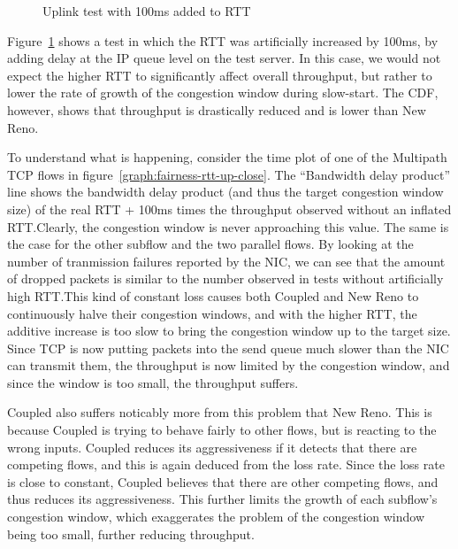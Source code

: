 \begin{figure}[h]
 \centering
 \subfloat[][CDF] {\
   \scalebox{0.55}{}\label{graph:fairness-rtt-up-cdf}
 }
 \subfloat[][Multipath TCP time plot] {\
   \scalebox{0.55}{}\label{graph:fairness-rtt-up-close}
 }
 \caption{Uplink test with 100ms added to RTT}\label{graph:fairness-rtt-up}
\end{figure}

Figure~\ref{graph:fairness-rtt-up} shows a test in which the RTT was
artificially increased by 100ms, by adding delay at the IP queue level on the test
server. In this case, we would not expect the higher RTT to significantly affect overall throughput, but rather to lower the rate of growth of the congestion window during slow-start. The CDF, however, shows that throughput is drastically reduced and is lower than New Reno.

To understand what is happening, consider the time plot of one of the Multipath
TCP flows in figure~\ref{graph:fairness-rtt-up-close}. The ``Bandwidth delay
product'' line shows the bandwidth delay product (and thus the target congestion
window size) of the real RTT + 100ms times the throughput observed without an
inflated RTT.\@ Clearly, the congestion window is never approaching this
value. The same is the case for the other subflow and the two parallel flows. By
looking at the number of tranmission failures reported by the NIC, we can see
that the amount of dropped packets is similar to the number observed in tests without artificially high RTT.\@ This kind of constant loss causes both Coupled and New Reno to continuously halve their congestion windows, and with
the higher RTT, the additive increase is too slow to bring the congestion
window up to the target size. Since TCP is now putting packets into the send
queue much slower than the NIC can transmit them, the throughput is now limited by
the congestion window, and since the window is too small, the throughput
suffers.

Coupled also suffers noticably more from this problem that New Reno. This
is because Coupled is trying to behave fairly to other flows, but is reacting to the wrong inputs.
Coupled reduces its aggressiveness if it detects that there are competing flows,
and this is again deduced from the loss rate. Since the loss rate is close to
constant, Coupled believes that there are other competing flows, and thus
reduces its aggressiveness. This further limits the growth of each subflow's
congestion window, which exaggerates the problem of the congestion window
being too small, further reducing throughput.

